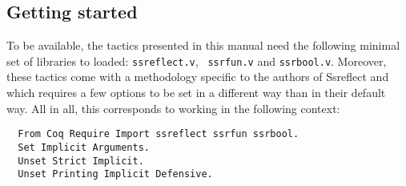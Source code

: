 \subsection{Getting started}\label{sec:files}
To be available, the tactics presented in this manual need the
following minimal set of libraries to loaded: {\tt ssreflect.v}, {\tt
ssrfun.v} and {\tt ssrbool.v}. Moreover, these tactics come with a
methodology specific to the authors of Ssreflect and which requires a
few options to be set in a different way than in their default
way. All in all, this corresponds to working in the following context:

\begin{lstlisting}
  From Coq Require Import ssreflect ssrfun ssrbool.
  Set Implicit Arguments.
  Unset Strict Implicit.
  Unset Printing Implicit Defensive.
\end{lstlisting}

